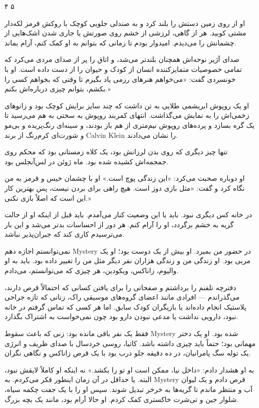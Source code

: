۴ ۵

او از روی زمین دستش را بلند کرد و به صندلی جلویی کوچک با روکش قرمز لکه‌دار مشتی کوبید. هر از گاهی، لرزشی از خشم روی صورتش یا جاری شدن اشک‌هایی از چشمانش را می‌دیدم. امیدوار بودم تا زمانی که بتوانم به او کمک کنم، آرام بماند.

صدای آژیر نوحه‌اش همچنان بلندتر می‌شد، و اتاق را پر از صدای مردی می‌کرد که تمامی خصوصیات متمایزکننده انسان از کودک و حیوان را از دست داده است. او با خونسردی گفت: «می‌خواهم هنرهای رزمی یاد بگیرم تا وقتی که بخواهم کسی را بکشم، بتوانم چیزی درباره‌اش بکنم.»

او یک روپوش ابریشمی طلایی به تن داشت که چند سایز برایش کوچک بود و زانوهای زخمی‌اش را به نمایش می‌گذاشت. انتهای کمربند روپوش به سختی به هم می‌رسید تا یک گره بسازد و پرده‌های روپوش نیم‌متری از هم باز بودند، و سینه‌ای رنگ‌پریده و بی‌مو و شورت‌ای کرم‌رنگ از برند Calvin Klein را نشان می‌دادند.

تنها چیز دیگری که روی بدن لرزانش بود، یک کلاه زمستانی بود که محکم روی جمجمه‌اش کشیده شده بود. ماه ژوئن در لس‌آنجلس بود.

او دوباره صحبت می‌کرد: «این زندگی پوچ است.» او با چشمان خیس و قرمز به من نگاه کرد و گفت: «مثل بازی دوز است. هیچ راهی برای بردن نیست، پس بهترین کار این است که اصلاً بازی نکنی.»

در خانه کس دیگری نبود. باید با این وضعیت کنار می‌آمدم. باید قبل از اینکه او از حالت گریه به خشم برگردد، او را آرام کنم. هر دور از احساسات بدتر می‌شد و این بار می‌ترسیدم کاری کند که جبران‌پذیر نباشد.

نمی‌توانستم اجازه دهم Mystery در حضور من بمیرد. او بیش از یک دوست بود؛ او یک مربی بود. او زندگی من و زندگی هزاران نفر دیگر مثل من را تغییر داده بود. باید به او والیوم، زاناکس، ویکودین، هر چیزی که می‌توانستم، می‌دادم.

دفترچه تلفنم را برداشتم و صفحاتی را برای یافتن کسانی که احتمالاً قرص دارند، می‌گذراندم — افرادی مانند اعضای گروه‌های موسیقی راک، زنانی که تازه جراحی پلاستیک انجام داده‌اند یا بازیگران کودک سابق. اما هر کسی که تماس گرفتم در خانه نبود، دارویی نداشت یا مدعی نبودن دارو بود چون نمی‌خواست به اشتراک بگذارد.

فقط یک نفر باقی مانده بود: زنی که باعث سقوط Mystery شده بود. او یک دختر مهمانی بود؛ حتماً باید چیزی داشته باشد. کاتیا، روسی خردسال با صدای ظریف و انرژی یک توله سگ پامرانیان، در ده دقیقه جلو درب بود با یک قرص زاناکس و نگاهی نگران.

به او هشدار دادم: «داخل نیا، ممکن است او تو را بکشد.» نه اینکه او کاملاً لایقش نبود، البته. یا حداقل در آن زمان اینطور فکر می‌کردم. به Mystery قرص دادم و یک لیوان آب و منتظر ماندم تا گریه‌ها به خرخر تبدیل شوند. سپس او را با یک جفت چکمه سیاه، شلوار جین و تی‌شرت خاکستری کمک کردم. او حالا آرام بود، مانند یک بچه بزرگ.

